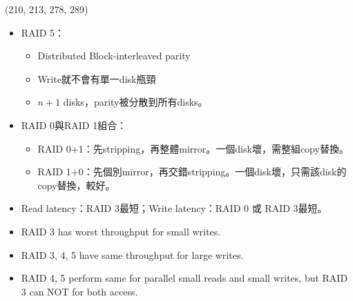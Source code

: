 \begin{theorem}{(210, 213, 278, 289)}
\begin{itemize}
\begin{itemize}
        \end{itemize}
        \item RAID 5：\begin{itemize}
            \item Distributed Block-interleaved parity
            \item Write就不會有單一disk瓶頸
            \item $n + 1$ disks，parity被分散到所有disks。
        \end{itemize}
        \item RAID 0與RAID 1組合：\begin{itemize}
            \item RAID 0+1：先stripping，再整體mirror。一個disk壞，需整組copy替換。
            \item RAID 1+0：先個別mirror，再交錯stripping。一個disk壞，只需該disk的copy替換，較好。
        \end{itemize}
        \item Read latency：RAID 3最短；Write latency：RAID 0 或 RAID 3最短。
        \item RAID 3 has worst throughput for small writes.
        \item RAID 3, 4, 5 have same throughput for large writes.
        \item RAID 4, 5 perform same for parallel small reads and small writes, but RAID 3 can NOT for both access.
    \end{itemize}
\end{theorem}